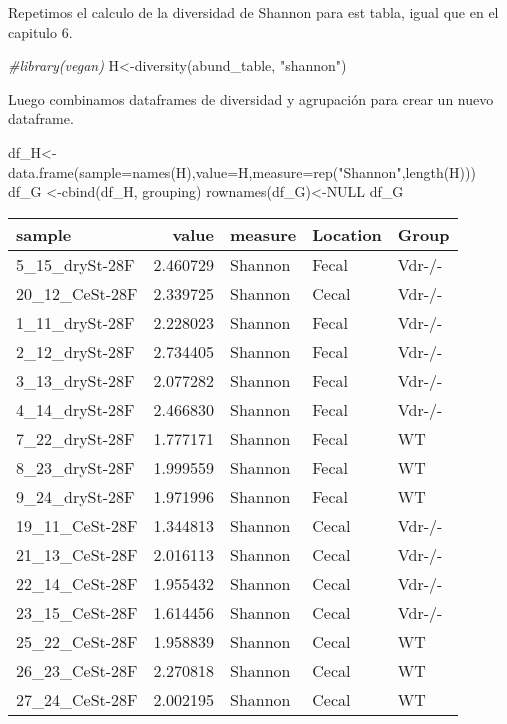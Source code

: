 \documentclass[
]{article}
\newenvironment{Shaded}{\begin{snugshade}}{\end{snugshade}}
\newcommand{\AttributeTok}[1]{\textcolor[rgb]{0.77,0.63,0.00}{#1}}
\newcommand{\CommentTok}[1]{\textcolor[rgb]{0.56,0.35,0.01}{\textit{#1}}}
\newcommand{\ConstantTok}[1]{\textcolor[rgb]{0.00,0.00,0.00}{#1}}
\newcommand{\FunctionTok}[1]{\textcolor[rgb]{0.00,0.00,0.00}{#1}}
\newcommand{\NormalTok}[1]{#1}
\newcommand{\OtherTok}[1]{\textcolor[rgb]{0.56,0.35,0.01}{#1}}
\newcommand{\StringTok}[1]{\textcolor[rgb]{0.31,0.60,0.02}{#1}}
\begin{document}
Repetimos el calculo de la diversidad de Shannon para est tabla, igual
que en el capitulo 6.

\begin{Shaded}
\begin{Highlighting}[]
\CommentTok{\#library(vegan)}
\NormalTok{H}\OtherTok{\textless{}{-}}\FunctionTok{diversity}\NormalTok{(abund\_table, }\StringTok{"shannon"}\NormalTok{) }
\end{Highlighting}
\end{Shaded}

Luego combinamos dataframes de diversidad y agrupación para crear un
nuevo dataframe.

\begin{Shaded}
\begin{Highlighting}[]
\NormalTok{df\_H}\OtherTok{\textless{}{-}}\FunctionTok{data.frame}\NormalTok{(}\AttributeTok{sample=}\FunctionTok{names}\NormalTok{(H),}\AttributeTok{value=}\NormalTok{H,}\AttributeTok{measure=}\FunctionTok{rep}\NormalTok{(}\StringTok{"Shannon"}\NormalTok{,}\FunctionTok{length}\NormalTok{(H)))}
\NormalTok{df\_G }\OtherTok{\textless{}{-}}\FunctionTok{cbind}\NormalTok{(df\_H, grouping)}
\FunctionTok{rownames}\NormalTok{(df\_G)}\OtherTok{\textless{}{-}}\ConstantTok{NULL}
\NormalTok{df\_G}
\end{Highlighting}
\end{Shaded}

\begin{longtable}[]{@{}lrlll@{}}
\toprule()
sample & value & measure & Location & Group \\
\midrule()
\endhead
5\_15\_drySt-28F & 2.460729 & Shannon & Fecal & Vdr-/- \\
20\_12\_CeSt-28F & 2.339725 & Shannon & Cecal & Vdr-/- \\
1\_11\_drySt-28F & 2.228023 & Shannon & Fecal & Vdr-/- \\
2\_12\_drySt-28F & 2.734405 & Shannon & Fecal & Vdr-/- \\
3\_13\_drySt-28F & 2.077282 & Shannon & Fecal & Vdr-/- \\
4\_14\_drySt-28F & 2.466830 & Shannon & Fecal & Vdr-/- \\
7\_22\_drySt-28F & 1.777171 & Shannon & Fecal & WT \\
8\_23\_drySt-28F & 1.999559 & Shannon & Fecal & WT \\
9\_24\_drySt-28F & 1.971996 & Shannon & Fecal & WT \\
19\_11\_CeSt-28F & 1.344813 & Shannon & Cecal & Vdr-/- \\
21\_13\_CeSt-28F & 2.016113 & Shannon & Cecal & Vdr-/- \\
22\_14\_CeSt-28F & 1.955432 & Shannon & Cecal & Vdr-/- \\
23\_15\_CeSt-28F & 1.614456 & Shannon & Cecal & Vdr-/- \\
25\_22\_CeSt-28F & 1.958839 & Shannon & Cecal & WT \\
26\_23\_CeSt-28F & 2.270818 & Shannon & Cecal & WT \\
27\_24\_CeSt-28F & 2.002195 & Shannon & Cecal & WT \\
\bottomrule()
\end{longtable}
\end{document}
